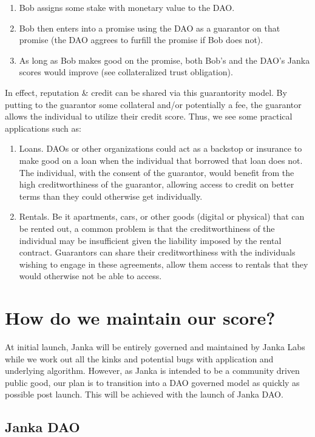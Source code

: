 \documentclass{article}
\begin{document}
\begin{enumerate}
    \item Bob assigns some stake with monetary value to the DAO.
    \item Bob then enters into a promise using the DAO as a guarantor on that promise (the DAO aggrees to furfill the promise if Bob does not).
    \item As long as Bob makes good on the promise, both Bob's and the DAO's Janka scores would improve (see collateralized trust obligation).
\end{enumerate}

In effect, reputation \& credit can be shared via this guarantority model. By putting to the guarantor some collateral and/or potentially a fee, the guarantor allows the individual to utilize their credit score. Thus, we see some practical applications such as:
\begin{enumerate}
    \item Loans. DAOs or other organizations could act as a backstop or insurance to make good on a loan when the individual that borrowed that loan does not. The individual, with the consent of the guarantor, would benefit from the high creditworthiness of the guarantor, allowing access to credit on better terms than they could otherwise get individually.
    \item Rentals. Be it apartments, cars, or other goods (digital or physical) that can be rented out, a common problem is that the creditworthiness of the individual may be insufficient given the liability imposed by the rental contract. Guarantors can share their creditworthiness with the individuals wishing to engage in these agreements, allow them access to rentals that they would otherwise not be able to access.
\end{enumerate}

\section{How do we maintain our score?}
At initial launch, Janka will be entirely governed and maintained by Janka Labs while we work out all the kinks and potential bugs with application and underlying algorithm. However, as Janka is intended to be a community driven public good, our plan is to transition into a DAO governed model as quickly as possible post launch. This will be achieved with the launch of Janka DAO.

\subsection{Janka DAO}
\end{document}
